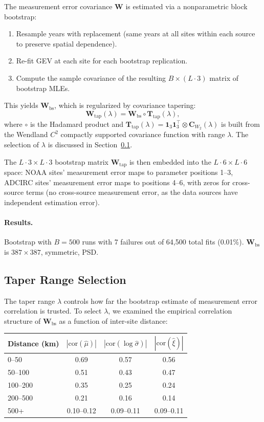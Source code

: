 \documentclass[11pt]{article}
\newcommand{\bW}{\mathbf{W}}
\begin{document}
The measurement error covariance $\bW$ is estimated via a nonparametric block bootstrap:
\begin{enumerate}[nosep]
    \item Resample years with replacement (same years at all sites within each source to preserve spatial dependence).
    \item Re-fit GEV at each site for each bootstrap replication.
    \item Compute the sample covariance of the resulting $B \times (L \cdot 3)$ matrix of bootstrap MLEs.
\end{enumerate}
This yields $\bW_{\text{bs}}$, which is regularized by covariance tapering:
\[
\bW_{\text{tap}}(\lambda) = \bW_{\text{bs}} \circ \mathbf{T}_{\text{tap}}(\lambda),
\]
where $\circ$ is the Hadamard product and $\mathbf{T}_{\text{tap}}(\lambda) = \mathbf{1}_3 \mathbf{1}_3^\top \otimes \mathbf{C}_{W_2}(\lambda)$ is built from the Wendland $C^2$ compactly supported covariance function with range $\lambda$. The selection of $\lambda$ is discussed in Section~\ref{sec:taper}.

The $L \cdot 3 \times L \cdot 3$ bootstrap matrix $\bW_{\text{tap}}$ is then embedded into the $L \cdot 6 \times L \cdot 6$ space: NOAA sites' measurement error maps to parameter positions 1--3, ADCIRC sites' measurement error maps to positions 4--6, with zeros for cross-source terms (no cross-source measurement error, as the data sources have independent estimation error).

\paragraph{Results.} Bootstrap with $B = 500$ runs with 7 failures out of 64,500 total fits (0.01\%). $\bW_{\text{bs}}$ is $387 \times 387$, symmetric, PSD.

\subsection{Taper Range Selection}
\label{sec:taper}

The taper range $\lambda$ controls how far the bootstrap estimate of measurement error correlation is trusted. To select $\lambda$, we examined the empirical correlation structure of $\bW_{\text{bs}}$ as a function of inter-site distance:

\begin{center}
\begin{tabular}{@{}lccc@{}}
\toprule
Distance (km) & $|\text{cor}(\hat{\mu})|$ & $|\text{cor}(\log\hat{\sigma})|$ & $|\text{cor}(\hat{\xi})|$ \\
\midrule
0--50     & 0.69 & 0.57 & 0.56 \\
50--100   & 0.51 & 0.43 & 0.47 \\
100--200  & 0.35 & 0.25 & 0.24 \\
200--500  & 0.21 & 0.16 & 0.14 \\
500+      & 0.10--0.12 & 0.09--0.11 & 0.09--0.11 \\
\bottomrule
\end{tabular}
\end{center}
\end{document}
